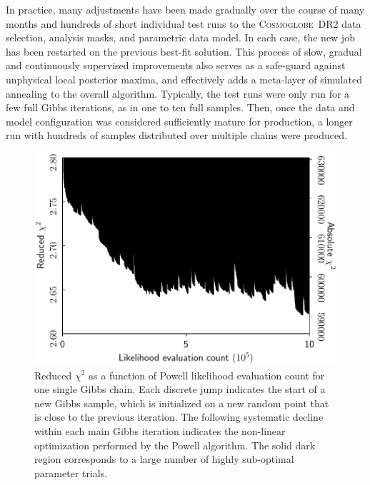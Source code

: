 \documentclass[twocolumn]{aa}
\newcommand{\cosmoglobe}{\textsc{Cosmoglobe}}
\begin{document}
In practice, many adjustments have been made gradually over the course
of many months and hundreds of short individual test runs to the
\cosmoglobe\ DR2 data selection, analysis masks, and parametric data
model. In each case, the new job has been restarted on the previous
best-fit solution. This process of slow, gradual and continuously
supervised improvements also serves as a safe-guard against unphysical
local posterior maxima, and effectively adds a meta-layer of simulated
annealing to the overall algorithm. Typically, the test runs were only
run for a few full Gibbs iterations, as in one to ten full
samples. Then, once the data and model configuration was considered
sufficiently mature for production, a longer run with hundreds of
samples distributed over multiple chains were produced.


\begin{figure}[t]
    \centering
    \includegraphics[width=\linewidth]{figs/powell_red_chisq_vs_iter.pdf}
    \caption{Reduced $\chi^2$ as a function of Powell likelihood evaluation count for one single Gibbs chain. Each discrete jump indicates the start of a new Gibbs sample, which is initialized on a new random point that is close to the previous iteration. The following systematic decline within each main Gibbs iteration indicates the non-linear optimization performed by the Powell algorithm.  The solid dark region corresponds to a large number of highly sub-optimal parameter trials. }
    \label{fig:powell_chisq_iter}
\end{figure}
\end{document}
